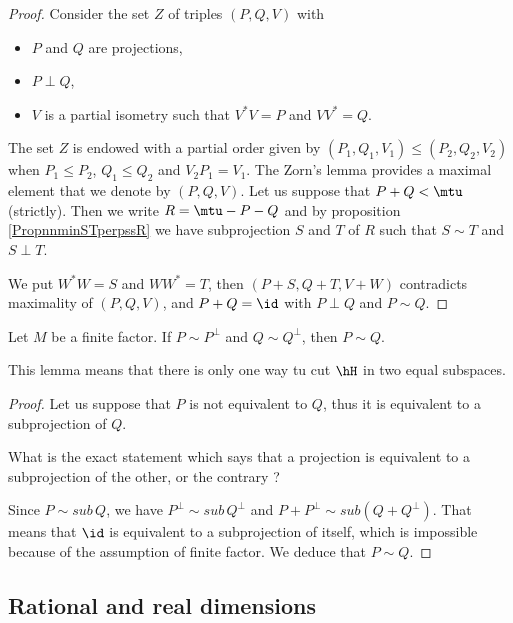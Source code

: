 \begin{proof}
Consider the set \( Z\) of triples \( (P,Q,V)\) with
\begin{itemize}
    \item \( P\) and \( Q\) are projections,
    \item \( P\perp Q\),
    \item
        \( V\) is a partial isometry such that \( V^*V=P\) and \( VV^*=Q\).
\end{itemize}
The set $Z$ is endowed with a partial order given by $(P_1,Q_1,V_1)\leq (P_2,Q_2,V_2)$ when $P_1\leq P_2$, $Q_1\leq Q_2$ and $V_2P_1=V_1$. The Zorn's lemma provides a maximal element that we denote by $(P,Q,V)$. Let us suppose that $P+Q<\mtu$ (strictly). Then we write $R=\mtu-P-Q$ and by proposition \ref{PropnnminSTperpssR} we have subprojection $S$ and $T$ of $R$ such that $S\sim T$ and $S\perp T$. 

We put $W^*W=S$ and $WW^*=T$, then $(P+S,Q+T,V+W)$ contradicts maximality of $(P,Q,V)$, and $P+Q=\id$ with $P\perp Q$ and $P\sim Q$.
\end{proof}

\begin{lemma}		\label{LemfinfacPPQQPsimQ}
Let $M$ be a finite factor. If $P\sim P^{\perp}$ and $Q\sim Q^{\perp}$, then $P\sim Q$.
\end{lemma}

This lemma means that there is only one way tu cut $\hH$ in two equal subspaces.

\begin{proof}
Let us suppose that $P$ is not equivalent to $Q$, thus it is equivalent to a subprojection of $Q$.

\begin{probleme}
What is the exact statement which says that a projection is equivalent to a subprojection of the other, or the contrary ?
\end{probleme}

Since $P\sim sub\, Q$, we have $P^{\perp}\sim sub\, Q^{\perp}$ and $P+P^{\perp}\sim sub(Q+Q^{\perp})$. That means that $\id$ is equivalent to a subprojection of itself, which is impossible because of the assumption of finite factor. We deduce that $P\sim Q$.
\end{proof}

					\subsection{Rational and real dimensions}
\label{SubSecRationalRealDim}

